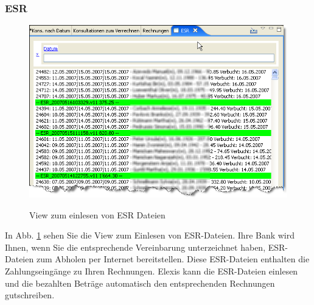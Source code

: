 \subsubsection{ESR}
\begin{figure}[hb]
  \includegraphics{images/esr1}\\
  \caption{View zum einlesen von ESR Dateien}\label{fig:esr}
\end{figure}

In Abb. \ref{fig:esr} sehen Sie die View zum Einlesen von ESR-Dateien. Ihre Bank wird Ihnen, wenn Sie die entsprechende Vereinbarung unterzeichnet haben, ESR-Dateien zum Abholen per Internet bereitstellen. Diese ESR-Dateien enthalten die Zahlungseingänge zu Ihren Rechnungen. Elexis kann die ESR-Dateien einlesen und die bezahlten Beträge automatisch den entsprechenden Rechnungen gutschreiben.

